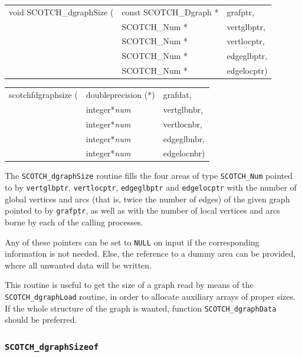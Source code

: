 \begin{itemize}
\progsyn

{\tt\begin{tabular}{l@{}ll}
void SCOTCH\_dgraphSize ( & const SCOTCH\_Dgraph * & grafptr,    \\
                          & SCOTCH\_Num *          & vertglbptr, \\
                          & SCOTCH\_Num *          & vertlocptr, \\
                          & SCOTCH\_Num *          & edgeglbptr, \\
                          & SCOTCH\_Num *          & edgelocptr)
\end{tabular}}

{\tt\begin{tabular}{l@{}ll}
scotchfdgraphsize ( & doubleprecision (*) & grafdat,    \\
                    & integer*{\it num}   & vertglbnbr, \\
                    & integer*{\it num}   & vertlocnbr, \\
                    & integer*{\it num}   & edgeglbnbr, \\
                    & integer*{\it num}   & edgelocnbr)
\end{tabular}}

\progdes

The {\tt SCOTCH\_dgraphSize} routine fills the four areas of type
{\tt SCOTCH\_\lbt Num} pointed to by {\tt vertglbptr},
{\tt vertlocptr}, {\tt edgeglbptr} and {\tt edgelocptr}
with the number of global vertices and arcs (that is, twice the number
of edges) of the given graph pointed to by {\tt grafptr}, as well as
with the number of local vertices and arcs borne by each of the
calling processes.

Any of these pointers can be set to {\tt NULL} on input if the
corresponding information is not needed. Else, the reference to a
dummy area can be provided, where all unwanted data will be written.

This routine is useful to get the size of a graph read by means
of the {\tt SCOTCH\_\lbt dgraph\lbo Load} routine, in order to allocate
auxiliary arrays of proper sizes. If the whole structure of the
graph is wanted, function {\tt SCOTCH\_dgraph\lbo Data} should be
preferred.

\end{itemize}

\subsubsection{{\tt SCOTCH\_dgraphSizeof}}

